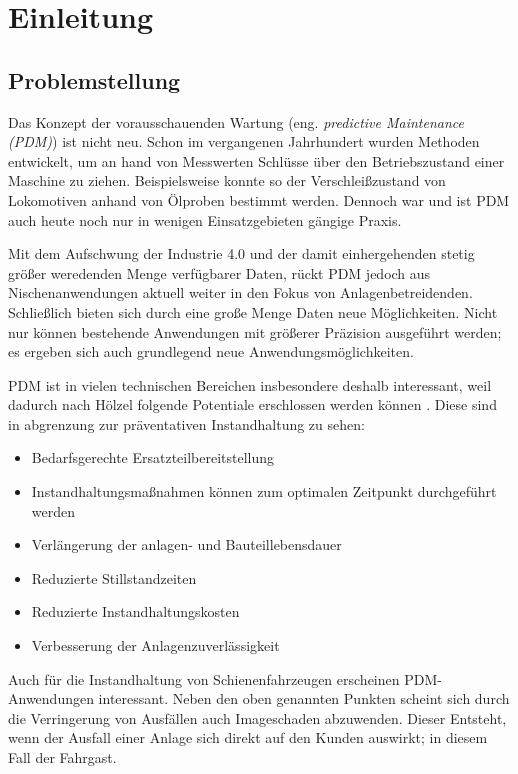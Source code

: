 \chapter{Einleitung}
\label{ch:einleitung}

\section{Problemstellung}
\label{sec:motivation}

Das Konzept der vorausschauenden Wartung (eng. \textit{predictive Maintenance (PDM)}) ist nicht neu. Schon im vergangenen Jahrhundert wurden Methoden entwickelt, um an hand von Messwerten Schlüsse über den Betriebszustand einer Maschine zu ziehen. Beispielsweise konnte so der Verschleißzustand von Lokomotiven anhand von Ölproben bestimmt werden.  Dennoch war und ist PDM auch heute noch nur in wenigen Einsatzgebieten gängige Praxis.

Mit dem Aufschwung der Industrie 4.0 und der damit einhergehenden stetig größer weredenden Menge verfügbarer Daten, rückt PDM jedoch aus Nischenanwendungen aktuell weiter in den Fokus von Anlagenbetreidenden. Schließlich bieten sich durch eine große Menge Daten neue Möglichkeiten. Nicht nur können bestehende Anwendungen mit größerer Präzision ausgeführt werden; es ergeben sich auch grundlegend neue Anwendungsmöglichkeiten. 

PDM ist in vielen technischen Bereichen insbesondere deshalb interessant, weil  dadurch nach Hölzel folgende Potentiale erschlossen werden können . Diese sind in abgrenzung zur präventativen Instandhaltung zu sehen:
\begin{itemize}
	\item Bedarfsgerechte Ersatzteilbereitstellung
	\item Instandhaltungsmaßnahmen können zum optimalen Zeitpunkt durchgeführt werden
	\item Verlängerung der anlagen- und Bauteillebensdauer
	\item Reduzierte Stillstandzeiten
	\item Reduzierte Instandhaltungskosten
	\item Verbesserung der Anlagenzuverlässigkeit
\end{itemize}

Auch für die Instandhaltung von Schienenfahrzeugen erscheinen PDM-Anwendungen interessant. Neben den oben genannten Punkten scheint sich durch die Verringerung von Ausfällen auch Imageschaden abzuwenden. Dieser Entsteht, wenn  der Ausfall einer Anlage sich direkt auf den Kunden auswirkt; in diesem Fall der Fahrgast.

